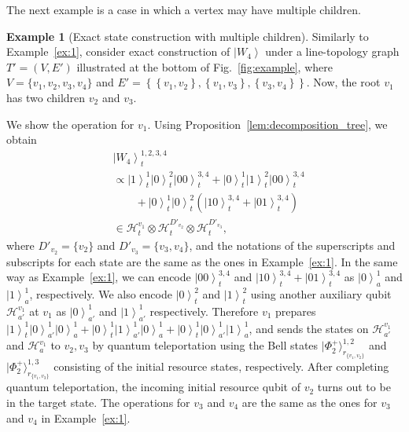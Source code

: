 \documentclass[preprintnumbers,aps,amsmath,amssymb,pra,twocolumn,showpacs,superscriptaddress,floatfix]{revtex4-1}
\def\Ket#1{\left|#1\right\rangle}
\newcommand{\ket}[1]{|{#1}\rangle}
\theoremstyle{plain}
\theoremstyle{definition}
\newtheorem{example}{Example}
\theoremstyle{remark}
\begin{document}
The next example is a case in which a vertex may have multiple children.
\begin{example}[\label{ex:2}Exact state construction with multiple children]
Similarly to Example~\ref{ex:1}, consider exact construction of $\Ket{W_4}$ under a line-topology graph $T'=(V, E')$ illustrated at the bottom of Fig.~\ref{fig:example}, where $V = \{v_1, v_2, v_3, v_4\}$ and $E'=\left\{\left\{v_1, v_2\right\}, \left\{v_1, v_3\right\}, \left\{v_3, v_4\right\}\right\}$.
Now, the root $v_1$ has two children $v_2$ and $v_3$.

We show the operation for $v_1$.
Using Proposition~\ref{lem:decomposition_tree}, we obtain
\begin{align*}
  &\Ket{W_4}_t^{1,2,3,4}\\
  &\propto\Ket{1}_t^1\Ket{0}_t^2\Ket{00}_t^{3,4}+\Ket{0}_t^1\Ket{1}_t^2\Ket{00}_t^{3,4}\\
  &\qquad+\Ket{0}_t^1\Ket{0}_t^2(\Ket{10}_t^{3,4}+\Ket{01}_t^{3,4})\\
  &\in\mathcal{H}_t^{v_1}\otimes\mathcal{H}_t^{D'_{v_2}}\otimes\mathcal{H}_t^{D'_{v_3}},
\end{align*}
where $D'_{v_2}=\{v_2\}$ and $D'_{v_3}=\{v_3,v_4\}$, and the notations of the superscripts and subscripts for each state are the same as the ones in Example~\ref{ex:1}.
In the same way as Example~\ref{ex:1}, we can encode $\Ket{00}_t^{3,4}$ and $\Ket{10}_t^{3,4}+\Ket{01}_t^{3,4}$  as $\Ket{0}_a^1$ and $\Ket{1}_a^1$, respectively.
We also encode $\Ket{0}_t^2$ and $\Ket{1}_t^2$ using another auxiliary qubit $\mathcal{H}_{a'}^{v_1}$ at $v_1$ as $\Ket{0}_{a'}^1$ and $\Ket{1}_{a'}^1$ respectively.
Therefore $v_1$ prepares $\Ket{1}_t^1\Ket{0}_{a'}^1\Ket{0}_a^1 + \Ket{0}_t^1\Ket{1}_{a'}^1\Ket{0}_a^1+\Ket{0}_t^1\Ket{0}_{a'}^1\Ket{1}_a^1$, and sends the states on $\mathcal{H}_{a'}^{v_1}$ and $\mathcal{H}_a^{v_1}$ to $v_2,v_3$ by quantum teleportation using the Bell states $\ket{\Phi_2^+}_{r_{\{v_1,v_2\}}}^{1,2}$ and $\ket{\Phi_2^+}_{r_{\{v_1,v_3\}}}^{1,3}$ consisting of the initial resource states, respectively.   After completing quantum teleportation, the incoming initial resource qubit of $v_2$ turns out to be in the target state.   The operations for $v_3$ and  $v_4$ are the same as the ones for $v_3$ and $v_4$ in Example~\ref{ex:1}.
\end{example}
\end{document}
